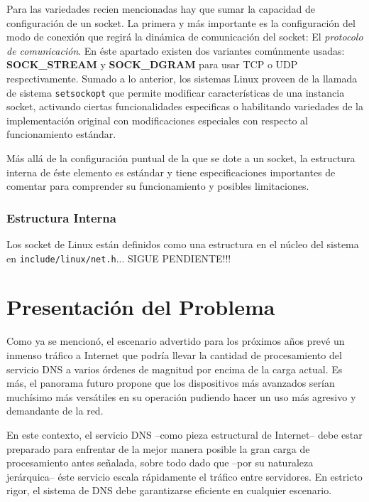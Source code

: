 Para las variedades recien mencionadas hay que sumar la capacidad de configuración de un socket. La primera y más importante es la configuración del modo de conexión que regirá la dinámica de comunicación del socket: El \emph{protocolo de comunicación}. En éste apartado existen dos variantes comúnmente usadas: \textbf{SOCK\_STREAM} y \textbf{SOCK\_DGRAM} para usar TCP o UDP respectivamente. Sumado a lo anterior, los sistemas Linux proveen de la llamada de sistema \verb=setsockopt= que permite modificar características de una instancia socket, activando ciertas funcionalidades especificas o habilitando variedades de la implementación original con modificaciones especiales con respecto al funcionamiento estándar.

Más allá de la configuración puntual de la que se dote a un socket, la estructura interna de éste elemento es estándar y tiene especificaciones importantes de comentar para comprender su funcionamiento y posibles limitaciones.

\subsubsection{Estructura Interna}
Los socket de Linux están definidos como una estructura en el núcleo del sistema en \verb=include/linux/net.h=... SIGUE PENDIENTE!!!

\section{Presentación del Problema}
Como ya se mencionó, el escenario advertido para los próximos años prevé un inmenso tráfico a Internet que podría llevar la cantidad de procesamiento del servicio DNS a varios órdenes de magnitud por encima de la carga actual. Es más, el panorama futuro propone que los dispositivos más avanzados serían muchísimo más versátiles en su operación pudiendo hacer un uso más agresivo y demandante de la red. 

En este contexto, el servicio DNS --como pieza estructural de Internet-- debe estar preparado para enfrentar de la mejor manera posible la gran carga de procesamiento antes señalada, sobre todo dado que --por su naturaleza jerárquica-- éste servicio escala rápidamente el tráfico entre servidores. En estricto rigor, el sistema de DNS debe garantizarse eficiente en cualquier escenario.

